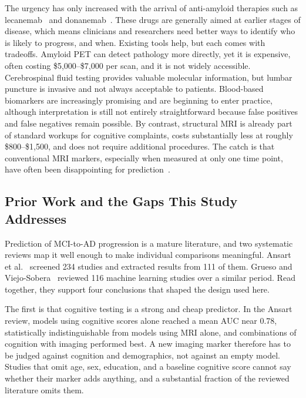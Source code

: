 \documentclass[blue]{ludusofficial}  %
\begin{document}
The urgency has only increased with the arrival of anti-amyloid therapies such as lecanemab~\cite{vanDyck2022lecanemab} and donanemab~\cite{sims2023donanemab}. These drugs are generally aimed at earlier stages of disease, which means clinicians and researchers need better ways to identify who is likely to progress, and when. Existing tools help, but each comes with tradeoffs. Amyloid PET can detect pathology more directly, yet it is expensive, often costing \$5,000--\$7,000 per scan, and it is not widely accessible. Cerebrospinal fluid testing provides valuable molecular information, but lumbar puncture is invasive and not always acceptable to patients. Blood-based biomarkers are increasingly promising and are beginning to enter practice, although interpretation is still not entirely straightforward because false positives and false negatives remain possible. By contrast, structural MRI is already part of standard workups for cognitive complaints, costs substantially less at roughly \$800--\$1,500, and does not require additional procedures. The catch is that conventional MRI markers, especially when measured at only one time point, have often been disappointing for prediction~\cite{baytas2024predicting}.

\subsection{Prior Work and the Gaps This Study Addresses}

Prediction of MCI-to-AD progression is a mature literature, and two systematic reviews map it well enough to make individual comparisons meaningful. Ansart et al.~\cite{ansart2021predicting} screened 234 studies and extracted results from 111 of them. Grueso and Viejo-Sobera~\cite{grueso2021machine} reviewed 116 machine learning studies over a similar period. Read together, they support four conclusions that shaped the design used here.

The first is that cognitive testing is a strong and cheap predictor. In the Ansart review, models using cognitive scores alone reached a mean AUC near 0.78, statistically indistinguishable from models using MRI alone, and combinations of cognition with imaging performed best. A new imaging marker therefore has to be judged against cognition and demographics, not against an empty model. Studies that omit age, sex, education, and a baseline cognitive score cannot say whether their marker adds anything, and a substantial fraction of the reviewed literature omits them.
\end{document}
